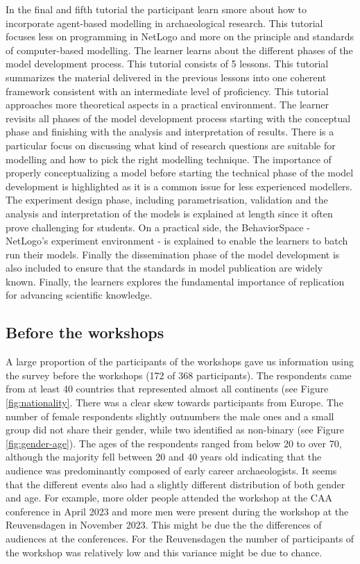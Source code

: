 \documentclass[
]{article}
\begin{document}
In the final and fifth tutorial the participant learn smore about how to incorporate agent-based modelling in archaeological research. This tutorial focuses less on programming in NetLogo and more on the principle and standards of computer-based modelling. The learner learns about the different phases of the model development process. This tutorial consists of 5 lessons. This tutorial summarizes the material delivered in the previous lessons into one coherent framework consistent with an intermediate level of proficiency. This tutorial approaches more theoretical aspects in a practical environment. The learner revisits all phases of the model development process starting with the conceptual phase and finishing with the analysis and interpretation of results. There is a particular focus on discussing what kind of research questions are suitable for modelling and how to pick the right modelling technique. The importance of properly conceptualizing a model before starting the technical phase of the model development is highlighted as it is a common issue for less experienced modellers. The experiment design phase, including parametrisation, validation and the analysis and interpretation of the models is explained at length since it often prove challenging for students. On a practical side, the BehaviorSpace - NetLogo's experiment environment - is explained to enable the learners to batch run their models. Finally the dissemination phase of the model development is also included to ensure that the standards in model publication are widely known. Finally, the learners explores the fundamental importance of replication for advancing scientific knowledge.

\hypertarget{before-the-workshops}{%
\subsection{Before the workshops}\label{before-the-workshops}}

A large proportion of the participants of the workshops gave us information using the survey before the workshops (172 of 368 participants). The respondents came from at least 40 countries that represented almost all continents (see Figure \ref{fig:nationality}. There was a clear skew towards participants from Europe. The number of female respondents slightly outnumbers the male ones and a small group did not share their gender, while two identified as non-binary (see Figure \ref{fig:gender-age}). The ages of the respondents ranged from below 20 to over 70, although the majority fell between 20 and 40 years old indicating that the audience was predominantly composed of early career archaeologists. It seems that the different events also had a slightly different distribution of both gender and age. For example, more older people attended the workshop at the CAA conference in April 2023 and more men were present during the workshop at the Reuvensdagen in November 2023. This might be due the the differences of audiences at the conferences. For the Reuvensdagen the number of participants of the workshop was relatively low and this variance might be due to chance.
\end{document}
